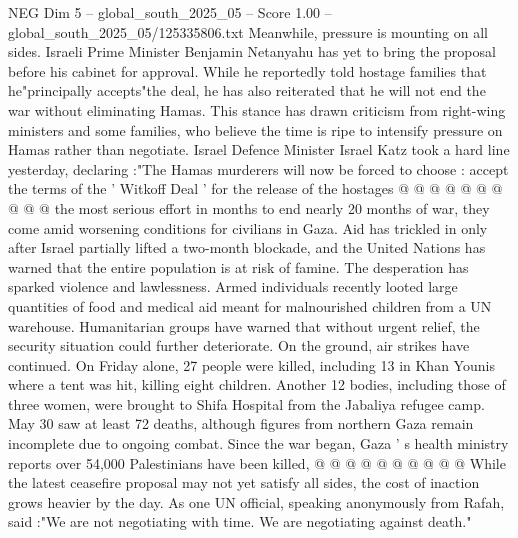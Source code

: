 \begin{textsample}{NEG Dim 5 – global\_south\_2025\_05 – Score 1.00 – global\_south\_2025\_05/125335806.txt}
Meanwhile, pressure is mounting on all sides.
Israeli Prime Minister Benjamin Netanyahu has yet to bring the proposal before his cabinet for approval.
While he reportedly told hostage families that he"principally accepts"the deal, he has also reiterated that he will not end the war without eliminating Hamas.
This stance has drawn criticism from right-wing ministers and some families, who believe the time is ripe to intensify pressure on Hamas rather than negotiate.
Israel Defence Minister Israel Katz took a hard line yesterday, declaring :"The Hamas murderers will now be forced to choose : accept the terms of the ' Witkoff Deal ' for the release of the hostages @ @ @ @ @ @ @ @ @ @ the most serious effort in months to end nearly 20 months of war, they come amid worsening conditions for civilians in Gaza.
Aid has trickled in only after Israel partially lifted a two-month blockade, and the United Nations has warned that the entire population is at risk of famine.
The desperation has sparked violence and lawlessness.
Armed individuals recently looted large quantities of food and medical aid meant for malnourished children from a UN warehouse.
Humanitarian groups have warned that without urgent relief, the security situation could further deteriorate.
On the ground, air strikes have continued.
On Friday alone, 27 people were killed, including 13 in Khan Younis where a tent was hit, killing eight children.
Another 12 bodies, including those of three women, were brought to Shifa Hospital from the Jabaliya refugee camp.
May 30 saw at least 72 deaths, although figures from northern Gaza remain incomplete due to ongoing combat.
Since the war began, Gaza ' s health ministry reports over 54,000 Palestinians have been killed, @ @ @ @ @ @ @ @ @ @ While the latest ceasefire proposal may not yet satisfy all sides, the cost of inaction grows heavier by the day.
As one UN official, speaking anonymously from Rafah, said :"We are not negotiating with time.
We are negotiating against death."

\end{textsample}
